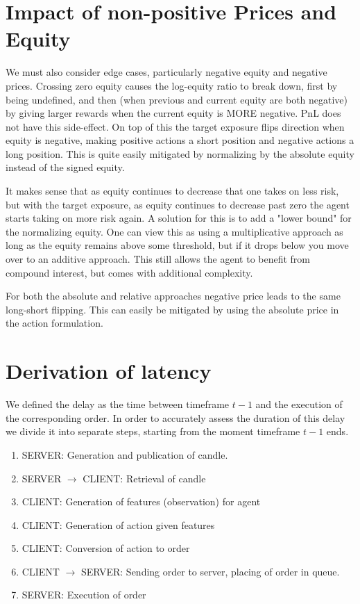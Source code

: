 \section{Impact of non-positive Prices and Equity}
\label{sec:neg-price-equity}

We must also consider edge cases, particularly negative equity and negative prices. Crossing zero equity causes the log-equity ratio to break down, first by being undefined, and then (when previous and current equity are both negative) by giving larger rewards when the current equity is MORE negative. PnL does not have this side-effect. On top of this the target exposure flips direction when equity is negative, making positive actions a short position and negative actions a long position. This is quite easily mitigated by normalizing by the absolute equity instead of the signed equity. 

It makes sense that as equity continues to decrease that one takes on less risk, but with the target exposure, as equity continues to decrease past zero the agent starts taking on more risk again. A solution for this is to add a "lower bound" for the normalizing equity. One can view this as using a multiplicative approach as long as the equity remains above some threshold, but if it drops below you move over to an additive approach. This still allows the agent to benefit from compound interest, but comes with additional complexity. 

For both the absolute and relative approaches negative price leads to the same long-short flipping. This can easily be mitigated by using the absolute price in the action formulation.

\section{Derivation of latency}

We defined the delay as the time between timeframe $t-1$ and the execution of the corresponding order. In order to accurately assess the duration of this delay we divide it into separate steps, starting from the moment timeframe $t-1$ ends.

\begin{enumerate}
    \item SERVER: Generation and publication of candle.
    \item SERVER $\to$ CLIENT: Retrieval of candle
    \item CLIENT: Generation of features (observation) for agent
    \item CLIENT: Generation of action given features
    \item CLIENT: Conversion of action to order
    \item CLIENT $\to$ SERVER: Sending order to server, placing of order in queue.
    \item SERVER: Execution of order
\end{enumerate}

